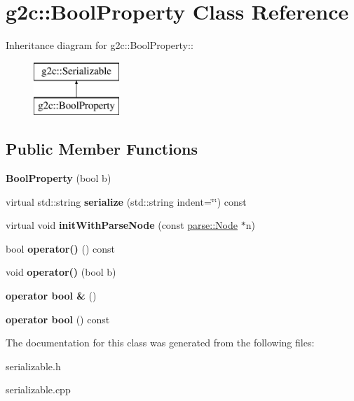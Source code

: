 \hypertarget{classg2c_1_1_bool_property}{
\section{g2c::BoolProperty Class Reference}
\label{classg2c_1_1_bool_property}
}
Inheritance diagram for g2c::BoolProperty::\begin{figure}[H]
\begin{center}
\leavevmode
\includegraphics[height=2cm]{classg2c_1_1_bool_property}
\end{center}
\end{figure}
\subsection*{Public Member Functions}
\begin{DoxyCompactItemize}
\item 
\hypertarget{classg2c_1_1_bool_property_ac31860e2441f19d6acda9b54e85224db}{
{\bfseries BoolProperty} (bool b)}
\label{classg2c_1_1_bool_property_ac31860e2441f19d6acda9b54e85224db}

\item 
\hypertarget{classg2c_1_1_bool_property_a1325708460de1bd544f59c9043994fa0}{
virtual std::string {\bfseries serialize} (std::string indent=\char`\"{}\char`\"{}) const }
\label{classg2c_1_1_bool_property_a1325708460de1bd544f59c9043994fa0}

\item 
\hypertarget{classg2c_1_1_bool_property_a81028e4090ce23f59e8ea76e8512d1de}{
virtual void {\bfseries initWithParseNode} (const \hyperlink{classparse_1_1_node}{parse::Node} $\ast$n)}
\label{classg2c_1_1_bool_property_a81028e4090ce23f59e8ea76e8512d1de}

\item 
\hypertarget{classg2c_1_1_bool_property_a90c28add9250ea51adcc8fe85552c939}{
bool {\bfseries operator()} () const }
\label{classg2c_1_1_bool_property_a90c28add9250ea51adcc8fe85552c939}

\item 
\hypertarget{classg2c_1_1_bool_property_a3fca96a0b1a70b748e485e5c373760a3}{
void {\bfseries operator()} (bool b)}
\label{classg2c_1_1_bool_property_a3fca96a0b1a70b748e485e5c373760a3}

\item 
\hypertarget{classg2c_1_1_bool_property_af78c0cc4057b558b190af07272faa757}{
{\bfseries operator bool \&} ()}
\label{classg2c_1_1_bool_property_af78c0cc4057b558b190af07272faa757}

\item 
\hypertarget{classg2c_1_1_bool_property_a14bf6fd075588e8fa08c27c6bb171a61}{
{\bfseries operator bool} () const }
\label{classg2c_1_1_bool_property_a14bf6fd075588e8fa08c27c6bb171a61}

\end{DoxyCompactItemize}


The documentation for this class was generated from the following files:\begin{DoxyCompactItemize}
\item 
serializable.h\item 
serializable.cpp\end{DoxyCompactItemize}
